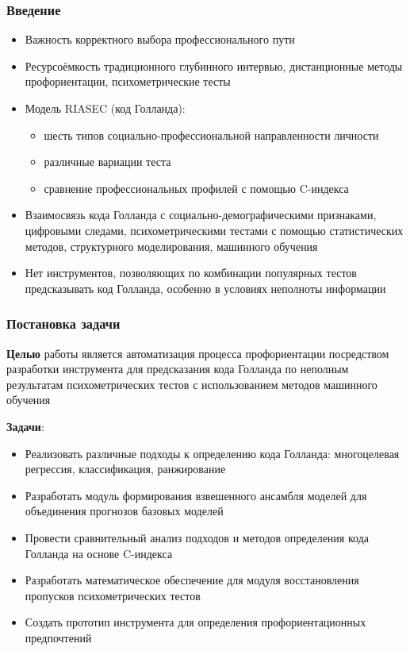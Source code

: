 \documentclass
  [ russian
  , aspectratio=169 %
  ] {beamer}
\begin{document}
\begin{frame}
    \frametitle{Введение}
    \begin{itemize}
        \item Важность корректного выбора профессионального пути

        \vspace{4pt}
        \item Ресурсоёмкость традиционного глубинного интервью, дистанционные методы профориентации, психометрические тесты

        \vspace{4pt}
        \item Модель RIASEC (код Голланда): 
            \begin{itemize}
                \item шесть типов социально-профессиональной направленности личности
                \item различные вариации теста
                \item сравнение профессиональных профилей с помощью C-индекса
            \end{itemize}

        \vspace{4pt}
        \item Взаимосвязь кода Голланда с социально-демографическими признаками, цифровыми следами, психометрическими тестами с помощью статистических методов, структурного моделирования, машинного обучения

        \vspace{4pt}
        \item Нет инструментов, позволяющих по комбинации популярных тестов предсказывать код Голланда, особенно в условиях неполноты информации
    \end{itemize}
\end{frame}


\begin{frame}
    \frametitle{Постановка задачи}
    \textbf{Целью} работы является автоматизация процесса профориентации посредством разработки инструмента для предсказания кода Голланда по неполным результатам психометрических тестов с использованием методов машинного обучения
    \vspace{0.5em}

    \textbf{Задачи}:
    \begin{itemize}
        \item Реализовать различные подходы к определению кода Голланда: многоцелевая регрессия, классификация, ранжирование
        \item Разработать модуль формирования взвешенного ансамбля моделей для объединения прогнозов базовых моделей
        \item Провести сравнительный анализ подходов и методов определения кода Голланда на основе C-индекса
        \item Разработать математическое обеспечение для модуля восстановления пропусков психометрических тестов
        \item Создать прототип инструмента для определения профориентационных предпочтений 
    \end{itemize}
\end{frame}
\end{document}
